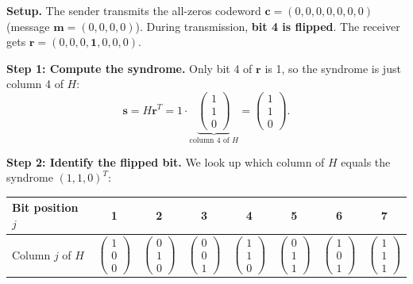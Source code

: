 \documentclass[11pt, a4paper]{article}
\theoremstyle{definition}
\theoremstyle{plain}
\theoremstyle{remark}
\begin{document}
\begin{workedexample}

\textbf{Setup.}
The sender transmits the all-zeros codeword
$\mathbf{c} = (0,0,0,0,0,0,0)$ (message $\mathbf{m} = (0,0,0,0)$).
During transmission, \textbf{bit 4 is flipped}.
The receiver gets $\mathbf{r} = (0,0,0,\mathbf{1},0,0,0)$.

\medskip\noindent
\textbf{Step 1: Compute the syndrome.}
Only bit 4 of $\mathbf{r}$ is 1, so the syndrome is just column 4
of $H$:
\[
  \mathbf{s}
  = H\mathbf{r}^T
  = 1 \cdot \underbrace{\begin{pmatrix}1\\1\\0\end{pmatrix}}_{\text{column 4 of }H}
  = \begin{pmatrix}1\\1\\0\end{pmatrix}.
\]

\medskip\noindent
\textbf{Step 2: Identify the flipped bit.}
We look up which column of $H$ equals the syndrome $(1,1,0)^T$:

\begin{center}
\begin{tabular}{@{}lccccccc@{}}
  \toprule
  Bit position $j$ & 1 & 2 & 3 & 4 & 5 & 6 & 7 \\
  \midrule
  Column $j$ of $H$ &
    $\begin{pmatrix}1\\0\\0\end{pmatrix}$ &
    $\begin{pmatrix}0\\1\\0\end{pmatrix}$ &
    $\begin{pmatrix}0\\0\\1\end{pmatrix}$ &
    $\begin{pmatrix}1\\1\\0\end{pmatrix}$ &
    $\begin{pmatrix}0\\1\\1\end{pmatrix}$ &
    $\begin{pmatrix}1\\0\\1\end{pmatrix}$ &
    $\begin{pmatrix}1\\1\\1\end{pmatrix}$ \\
  \bottomrule
\end{tabular}
\end{center}


\end{workedexample}
\end{document}
